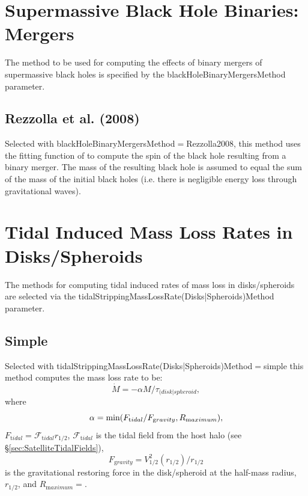 \section{Supermassive Black Hole Binaries: Mergers}

The method to be used for computing the effects of binary mergers of supermassive black holes is specified by the {\normalfont \ttfamily blackHoleBinaryMergersMethod} parameter.

\subsection{Rezzolla et al. (2008)}

Selected with {\normalfont \ttfamily blackHoleBinaryMergersMethod}$=${\normalfont \ttfamily Rezzolla2008}, this method uses the fitting function of \cite{rezzolla_final_2008} to compute the spin of the black hole resulting from a binary merger. The mass of the resulting black hole is assumed to equal the sum of the mass of the initial black holes (i.e. there is negligible energy loss through gravitational waves).

\section{Tidal Induced Mass Loss Rates in Disks/Spheroids}\label{sec:TidalMassLossRates}

The methods for computing tidal induced rates of mass loss in disks/spheroids are selected via the {\normalfont \ttfamily tidalStrippingMassLossRate(Disks|Spheroids)Method} parameter.

\subsection{Simple}

Selected with {\normalfont \ttfamily tidalStrippingMassLossRate(Disks|Spheroids)Method}$=${\normalfont \ttfamily simple} this method computes the mass loss rate to be:
\begin{equation}
\dot{M} = -\alpha M/\tau_{\mathrm (disk|spheroid},
\end{equation}
where
\begin{equation}
\alpha = \hbox{min}(F_{\mathrm tidal}/F_{\mathrm gravity},R_{\mathrm maximum}),
\end{equation}
$F_{\mathrm tidal}=\mathcal{F}_{\mathrm tidal} r_{1/2}$, $\mathcal{F}_{\mathrm tidal}$ is the tidal field from the host halo (see \S\ref{sec:SatelliteTidalFields}),
\begin{equation}
F_{\mathrm gravity} = V_{1/2}^2(r_{1/2})/r_{1/2}
\end{equation}
is the gravitational restoring force in the disk/spheroid at the half-mass radius, $r_{\mathrm 1/2}$, and $R_{\mathrm maximum}=${\normalfont {}}.

